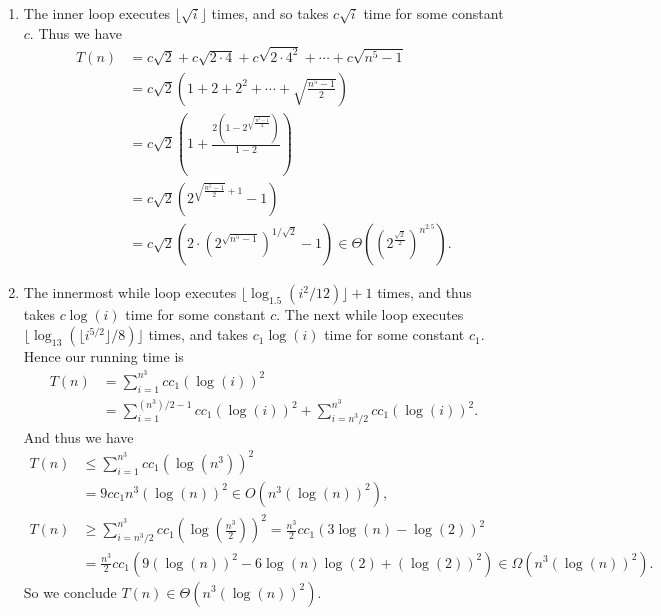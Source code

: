 \documentclass[10pt,oneside,reqno]{amsart}
\theoremstyle{plain}
\theoremstyle{definition}
\begin{document}
\begin{enumerate}[label=\arabic*.]
\item The inner loop executes $\lfloor \sqrt{i} \rfloor$ times, and so takes $c\sqrt{i}$ time for some constant $c$. Thus we have
\begin{equation}
\begin{aligned}
T(n) &=  c\sqrt{2} + c\sqrt{2\cdot 4} + c\sqrt{2\cdot 4^2} + \cdots + c\sqrt{n^5 - 1}\\
&= c\sqrt{2} \left(1 + 2 + 2^2 + \cdots + \sqrt{\frac{n^5 - 1}{2}} \right)\\
&= c\sqrt{2} \left(1 +  \frac{2(1- 2^{\sqrt{\frac{n^5 - 1}{2}}})}{1-2} \right)\\
&= c\sqrt{2} \left(  2^{\sqrt{\frac{n^5 - 1}{2}} + 1} - 1 \right)\\
&= c\sqrt{2} \left(  2 \cdot (2^{\sqrt{n^5 - 1}})^{1/\sqrt{2}}
 - 1 \right) \in \Theta \left( \left(2^{\frac{\sqrt{2}}{2}}\right)^{n^{2.5}} \right). 
\end{aligned}
\end{equation}

\item The innermost while loop executes $\lfloor \log_{1.5}(i^2/12)\rfloor + 1$ times, and thus takes $c\log(i)$ time for some constant $c$. The next while loop executes $\lfloor \log_{13}\left( \lfloor i^{5/2} \rfloor /8 \right) \rfloor$ times, and takes $c_1 \log(i)$ time for some constant $c_1$. Hence our running time is
\begin{equation}
\begin{aligned}
T(n) &=  \sum_{i = 1}^{n^3} cc_1(\log(i))^2\\
&=  \sum_{i = 1}^{(n^3)/2 -1} cc_1(\log(i))^2 +  \sum_{i = n^3/2}^{n^3} cc_1(\log(i))^2.
\end{aligned}
\end{equation}
And thus we have
\begin{equation}
\begin{aligned}
T(n) &\leq  \sum_{i = 1}^{n^3} cc_1(\log(n^3))^2\\
 &= 9cc_1n^3(\log(n))^2 \in O \left( n^3(\log(n))^2 \right),\\
T(n) &\geq  \sum_{i = n^3/2}^{n^3} cc_1(\log(\frac{n^3}{2}))^2 = \frac{n^3}{2}cc_1(3\log(n) - \log(2))^2\\
&= \frac{n^3}{2}cc_1(9(\log(n))^2 - 6\log(n)\log(2) +  (\log(2))^2) \in \Omega \left( n^3(\log(n))^2 \right). 
\end{aligned}
\end{equation}
So we conclude $T(n) \in \Theta \left( n^3(\log(n))^2  \right)$. 

















\end{enumerate}
\end{document}
